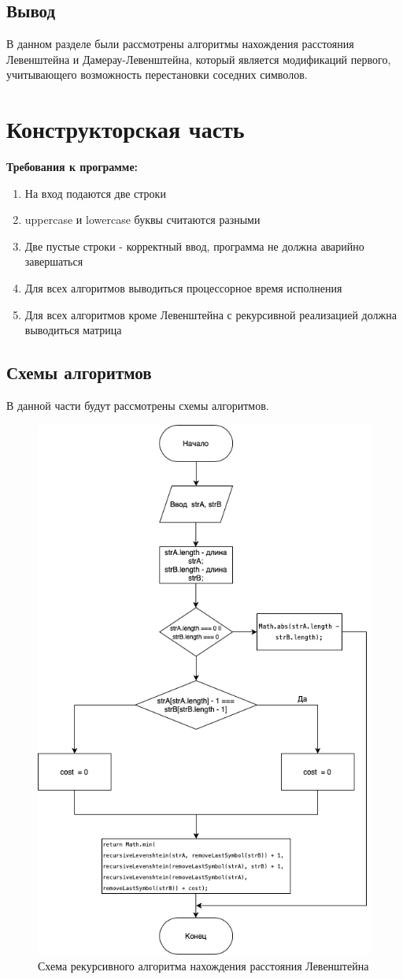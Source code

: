 \documentclass[12pt]{report}
\begin{document}
		\section{Вывод}
		В данном разделе были рассмотрены алгоритмы нахождения расстояния Левенштейна и Дамерау-Левенштейна, который является модификаций первого, учитывающего возможность перестановки соседних символов. 




\chapter{Конструкторская часть}
\textbf{Требования к программе:}
\begin{enumerate}
	\item На вход подаются две строки
	\item uppercase и lowercase буквы считаются разными
  	\item Две пустые строки - корректный ввод, программа не должна аварийно завершаться
  	\item Для всех алгоритмов выводиться процессорное время исполнения
  	\item Для всех алгоритмов кроме Левенштейна с рекурсивной реализацией должна выводиться матрица
\end{enumerate}
\section{Схемы алгоритмов}
В данной части будут рассмотрены схемы алгоритмов.

\begin{figure}[h]
\centering
\includegraphics[width=0.70\linewidth]{recursiveLevenshtein.png}
\caption{Схема рекурсивного алгоритма нахождения расстояния Левенштейна}
\label{fig:mpr}
\end{figure}
\end{document}
